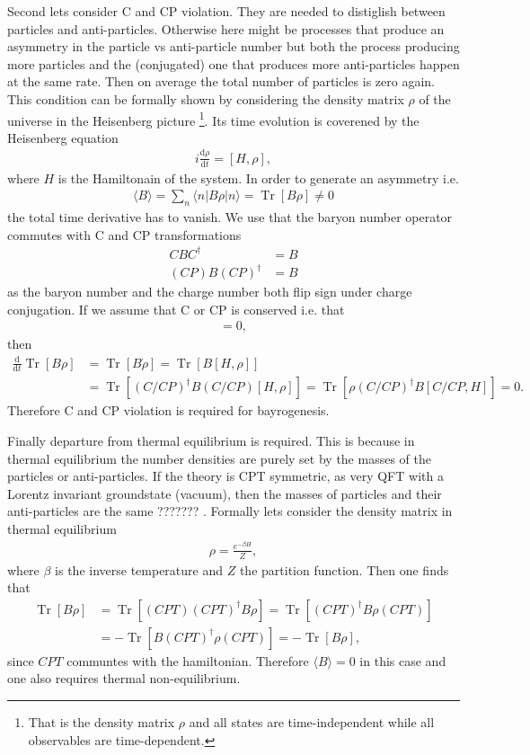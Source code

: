 \documentclass[13pt,a4paper,twoside,titlepage]{article}
\newcommand{\Tr}{\operatorname{Tr}}
\begin{document}
Second lets consider C and CP violation. They are needed to distiglish between particles and anti-particles. Otherwise here might be processes that produce an asymmetry in the
particle vs anti-particle number but both the process producing more particles and the (conjugated) one that produces more anti-particles happen at the same rate.
Then on average the total number of particles is zero again.
This condition can be formally shown by considering the density matrix $\rho$ of the universe in the Heisenberg picture \footnote{That is the density matrix $\rho$ and all states are time-independent while all observables are time-dependent.}. Its time evolution is coverened by the Heisenberg equation
\begin{align}
    i \frac{\mathrm{d} \rho}{\mathrm{d} t} = [H, \rho],
\end{align}
where $H$ is the Hamiltonain of the system.
In order to generate an asymmetry i.e.
\begin{align}
    \langle B \rangle = \sum_n  \langle n | B \rho | n \rangle = \Tr [ B \rho ] \neq 0
\end{align}
the total time derivative has to vanish.
We use that the baryon number operator commutes with C and CP transformations
\begin{align}
    C B C^\dagger &= B \\
    (C P) B (C P)^\dagger &= B
\end{align}
as the baryon number and the charge number both flip sign under charge conjugation.
If we assume that C or CP is conserved i.e. that
\begin{align}
[H, C/CP] = 0,
\end{align}
then
\begin{align}
    \frac{\mathrm{d}}{\mathrm{d} t} \Tr [ B \rho ] &= \Tr [ B \dot{\rho} ] = \Tr [ B [H, \rho] ] \\
    &= \Tr [ (C/CP)^\dagger B (C/CP) [H, \rho] ] = \Tr [ \rho (C/CP)^\dagger B [C/CP, H] ] = 0.
\end{align}
Therefore C and CP violation is required for bayrogenesis.

Finally departure from thermal equilibrium is required. This is because in thermal equilibrium the number densities are purely set by the
masses of the particles or anti-particles. If the theory is CPT symmetric, as very QFT with a Lorentz invariant groundstate (vacuum), then the
masses of particles and their anti-particles are the same ??????? .
Formally lets consider the density matrix in thermal equilibrium
\begin{align}
    \rho = \frac{e^{- \beta H}}{Z},
\end{align}
where $\beta$ is the inverse temperature and $Z$ the partition function.
Then one finds that
\begin{align}
    \Tr [ B \rho ] &=  \Tr [ (CPT) (CPT)^\dagger B \rho ] = \Tr [ (CPT)^\dagger B \rho (CPT) ]  \\
                   &= - \Tr [ B (CPT)^\dagger \rho (CPT) ] = - \Tr [ B \rho ],
\end{align}
since $CPT$ communtes with the hamiltonian. Therefore $\langle B \rangle = 0$ in this case and one also requires thermal non-equilibrium.
\end{document}
